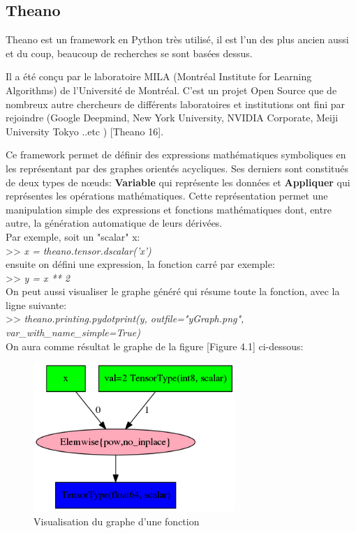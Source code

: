 \subsection{Theano}
	Theano est un framework en Python très utilisé, il est l'un des plus ancien aussi et du coup, beaucoup de recherches se sont basées dessus. 

	Il a été conçu par le laboratoire MILA (Montréal Institute for Learning Algorithms) de l’Université de Montréal. C'est un projet Open Source que de nombreux autre chercheurs de différents laboratoires et institutions ont fini par rejoindre (Google Deepmind, New  York  University, NVIDIA Corporate, Meiji  University Tokyo ..etc ) [Theano 16].

	Ce framework permet de définir des expressions mathématiques symboliques en les représentant par des graphes orientés acycliques. Ses derniers sont constitués de deux types de nœuds: \textbf{Variable} qui représente les données et \textbf{Appliquer} qui représentes les opérations mathématiques. Cette représentation permet une manipulation simple des expressions et fonctions mathématiques dont, entre autre, la génération automatique de leurs dérivées.\\

Par exemple, soit un "scalar" x: \\

>> \textit{x = theano.tensor.dscalar('x')}\\

ensuite on défini une expression, la fonction carré par exemple: \\

>> \textit{y = x ** 2}\\

	On peut aussi visualiser le graphe généré qui résume toute la fonction, avec la ligne suivante:\\

>> \textit{theano.printing.pydotprint(y, outfile="yGraph.png", var\_with\_name\_simple=True)}\\

On aura comme résultat le graphe de la figure [Figure 4.1] ci-dessous:

\begin{figure}[H]
	\centering
		\includegraphics[width=3in]{Figures/yGraph.png}
	\caption[TheanoGraph]{Visualisation du graphe d'une fonction}
	\label{fig:Electron}
\end{figure}

